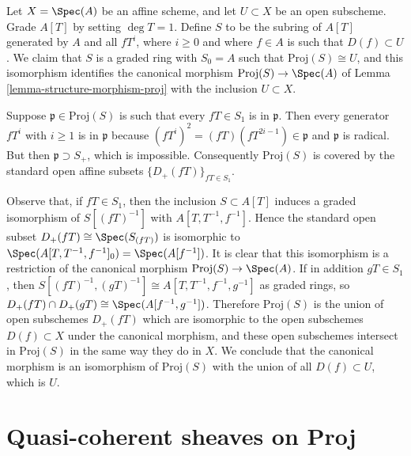 \begin{example}
\label{example-open-subset-proj}
Let $X = \Spec(A)$ be an affine scheme, and let $U \subset X$
be an open subscheme.  Grade $A[T]$ by setting $\deg T = 1$.  Define $S$
to be the subring of $A[T]$ generated by $A$ and all $fT^i$, where $i \ge 0$
and where $f \in A$ is such that $D(f) \subset U$.  We claim that $S$
is a graded ring with $S_0 = A$ such that $\text{Proj}(S) \cong U$,
and this isomorphism identifies the canonical morphism
$\text{Proj}(S) \to \Spec(A)$ of Lemma \ref{lemma-structure-morphism-proj}
with the inclusion $U \subset X$.

\medskip\noindent
Suppose $\mathfrak p \in \text{Proj}(S)$ is such that every $fT \in S_1$
is in $\mathfrak p$.  Then every generator $fT^i$ with $i \ge 1$
is in $\mathfrak p$ because $(fT^i)^2 = (fT)(fT^{2i-1}) \in \mathfrak p$
and $\mathfrak p$ is radical.  But then $\mathfrak p \supset S_+$, which
is impossible. Consequently $\text{Proj}(S)$ is covered by the standard
open affine subsets $\{D_+(fT)\}_{fT \in S_1}$.

\medskip\noindent
Observe that, if $fT \in S_1$, then the inclusion $S \subset A[T]$
induces a graded isomorphism of $S[(fT)^{-1}]$ with $A[T, T^{-1}, f^{-1}]$.
Hence the standard open subset $D_+(fT) \cong \Spec(S_{(fT)})$
is isomorphic to $\Spec(A[T, T^{-1}, f^{-1}]_0) = \Spec(A[f^{-1}])$.
It is clear that this isomorphism is a restriction of the canonical morphism
$\text{Proj}(S) \to \Spec(A)$.  If in addition $gT \in S_1$, then
$S[(fT)^{-1}, (gT)^{-1}] \cong A[T, T^{-1}, f^{-1}, g^{-1}]$
as graded rings, so $D_+(fT) \cap D_+(gT) \cong \Spec(A[f^{-1}, g^{-1}])$.
Therefore $\text{Proj}(S)$ is the union of open subschemes $D_+(fT)$
which are isomorphic to the open subschemes $D(f) \subset X$
under the canonical morphism, and these open subschemes intersect
in $\text{Proj}(S)$ in the same way they do in $X$.
We conclude that the canonical morphism is an isomorphism of
$\text{Proj}(S)$ with the union of all $D(f) \subset U$, which is $U$.
\end{example}





















\section{Quasi-coherent sheaves on Proj}
\label{section-quasi-coherent-proj}

